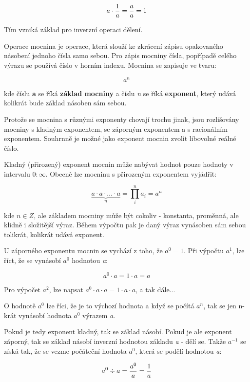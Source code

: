 $$ a \cdot {1 \over a} = {a \over a} = 1 $$

Tím vzniká základ pro inverzní operaci dělení.



Operace mocnina je operace, která slouží ke zkrácení zápisu opakovaného násobení jednoho čísla samo sebou. Pro zápis mocniny čísla, popřípadě celého výrazu se používá číslo v horním indexu. Mocnina se zapisuje ve tvaru:

$$ a^n $$

kde číslu {\bf a} se říká {\bf základ mocniny} a číslu {\it n} se říká {\bf exponent}, který udává kolikrát bude základ násoben sám sebou.

Protože se mocnina s různými exponenty chovají trochu jinak, jsou rozlišovány mocniny s kladným exponentem, se záporným exponentem a s racionálním exponentem. Souhrnně je možné jako exponent mocnin zvolit libovolné reálné číslo.


Kladný (přirozený) exponent mocnin může nabývat hodnot pouze hodnoty v intervalu $0:\infty$. Obecně lze mocninu s přirozeným exponentem vyjádřit:

$$ \underbrace {a\cdot a \cdot ... \cdot a}_n = \prod_i^n {a_i} = a^n $$

kde $n \in Z$, ale základem mocniny může být cokoliv - konstanta, proměnná, ale klidně i složitější výraz. Během výpočtu pak je daný výraz vynásoben sám sebou tolikrát, kolikrát udává exponent.


U záporného exponentu mocnin se vychází z toho, že $a^0 = 1$. Při výpočtu $a^1$, lze říct, že se vynásobí $a^0$ hodnotou {\it a}:

$$ a^0 \cdot a = 1 \cdot a = a  $$

Pro výpočet $a^2$, lze napsat $a^0 \cdot a \cdot a = 1 \cdot a \cdot a$, a tak dále...

O hodnotě $a^0$ lze říci, že je to výchozí hodnota a když se počítá $a^n$, tak se jen n-krát vynásobí hodnota $a^0$ výrazem {\it a}.

Pokud je tedy exponent kladný, tak se základ násobí. Pokud je ale exponent záporný, tak se základ násobí inverzní hodnotou základu {\it a} - dělí se.  Takže $a^{-1}$ se získá tak, že se vezme počáteční hodnota $a^0$, která se podělí hodnotou {\it a}:

$$ a^0 \div a = {a^0 \over a} = {1 \over a} $$

